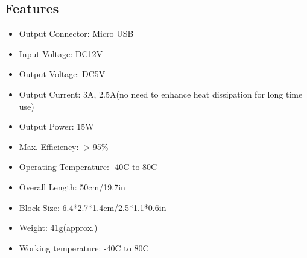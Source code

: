 \subsection{Features}
\begin{itemize}
	\item Output Connector: Micro USB
	\item Input Voltage: DC12V
	\item Output Voltage: DC5V
	\item Output Current: 3A, 2.5A(no need to enhance heat dissipation for long time use)
	\item Output Power: 15W
	\item Max. Efficiency: $>$95\%
	\item Operating Temperature: -40\degree C to 80\degree C
	\item Overall Length: 50cm/19.7in
	\item Block Size: 6.4*2.7*1.4cm/2.5*1.1*0.6in
	\item Weight: 41g(approx.)
	\item Working temperature: -40\degree C to 80\degree C
\end{itemize}
